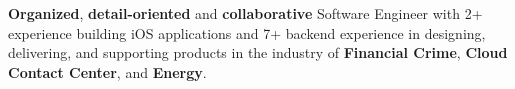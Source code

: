 
\begin{cvparagraph}
    \textbf{Organized}, \textbf{detail-oriented} and \textbf{collaborative} Software Engineer with 2+ experience building iOS applications and 7+ backend experience in designing, delivering, and supporting products in the industry of \textbf{Financial Crime}, \textbf{Cloud Contact Center}, and \textbf{Energy}.

\end{cvparagraph}




